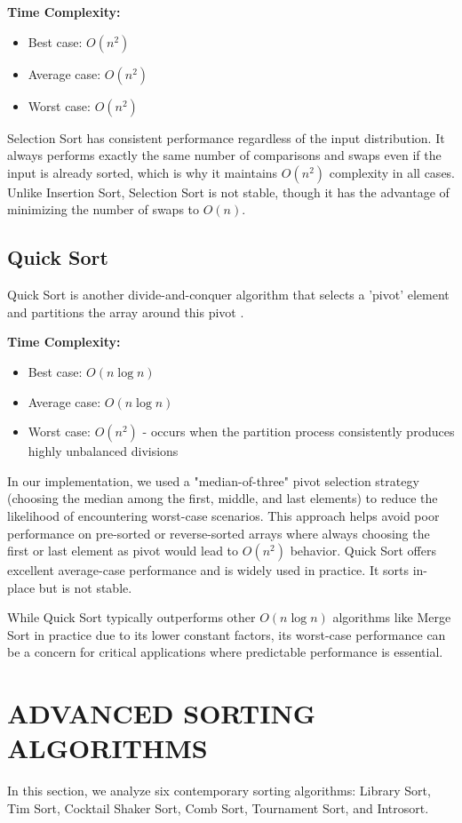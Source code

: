 \documentclass[sigconf]{acmart}
\begin{document}
\textbf{Time Complexity:}
\begin{itemize}
    \item Best case: $O(n^2)$
    \item Average case: $O(n^2)$
    \item Worst case: $O(n^2)$
\end{itemize}

Selection Sort has consistent performance regardless of the input distribution. It always performs exactly the same number of comparisons and swaps even if the input is already sorted, which is why it maintains $O(n^2)$ complexity in all cases. Unlike Insertion Sort, Selection Sort is not stable, though it has the advantage of minimizing the number of swaps to $O(n)$.

\subsection{Quick Sort}
Quick Sort is another divide-and-conquer algorithm that selects a 'pivot' element and partitions the array around this pivot \cite{hoare1961algorithm}.

\textbf{Time Complexity:}
\begin{itemize}
    \item Best case: $O(n \log n)$
    \item Average case: $O(n \log n)$
    \item Worst case: $O(n^2)$ - occurs when the partition process consistently produces highly unbalanced divisions
\end{itemize}

In our implementation, we used a "median-of-three" pivot selection strategy (choosing the median among the first, middle, and last elements) to reduce the likelihood of encountering worst-case scenarios. This approach helps avoid poor performance on pre-sorted or reverse-sorted arrays where always choosing the first or last element as pivot would lead to $O(n^2)$ behavior. Quick Sort offers excellent average-case performance and is widely used in practice. It sorts in-place but is not stable.

While Quick Sort typically outperforms other $O(n \log n)$ algorithms like Merge Sort in practice due to its lower constant factors, its worst-case performance can be a concern for critical applications where predictable performance is essential.

\section{ADVANCED SORTING ALGORITHMS}
In this section, we analyze six contemporary sorting algorithms: Library Sort, Tim Sort, Cocktail Shaker Sort, Comb Sort, Tournament Sort, and Introsort.
\end{document}
